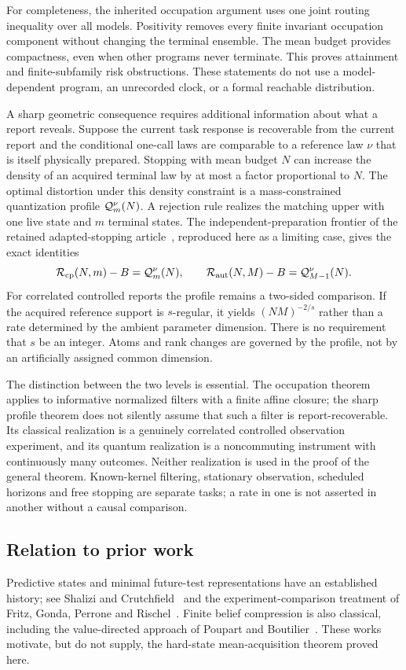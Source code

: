 For completeness, the inherited occupation argument uses one joint routing inequality over all models. Positivity removes every finite invariant occupation component without changing the terminal ensemble. The mean budget provides compactness, even when other programs never terminate. This proves attainment and finite-subfamily risk obstructions. These statements do not use a model-dependent program, an unrecorded clock, or a formal reachable distribution.

A sharp geometric consequence requires additional information about what a report reveals. Suppose the current task response is recoverable from the current report and the conditional one-call laws are comparable to a reference law $\nu$ that is itself physically prepared. Stopping with mean budget $N$ can increase the density of an acquired terminal law by at most a factor proportional to $N$. The optimal distortion under this density constraint is a mass-constrained quantization profile $\mathcal Q_m^\nu(N)$. A rejection rule realizes the matching upper with one live state and $m$ terminal states. The independent-preparation frontier of the retained adapted-stopping article~\cite{GTFStopped}, reproduced here as a limiting case, gives the exact identities
\begin{equation}\label{eq:intro-exact}
 \mathcal R_{\mathrm{cp}}(N,m)-B=\mathcal Q_m^\nu(N),\qquad
 \mathcal R_{\mathrm{aut}}(N,M)-B=\mathcal Q_{M-1}^\nu(N).
\end{equation}
For correlated controlled reports the profile remains a two-sided comparison. If the acquired reference support is $s$-regular, it yields $(NM)^{-2/s}$ rather than a rate determined by the ambient parameter dimension. There is no requirement that $s$ be an integer. Atoms and rank changes are governed by the profile, not by an artificially assigned common dimension.

The distinction between the two levels is essential. The occupation theorem applies to informative normalized filters with a finite affine closure; the sharp profile theorem does not silently assume that such a filter is report-recoverable. Its classical realization is a genuinely correlated controlled observation experiment, and its quantum realization is a noncommuting instrument with continuously many outcomes. Neither realization is used in the proof of the general theorem. Known-kernel filtering, stationary observation, scheduled horizons and free stopping are separate tasks; a rate in one is not asserted in another without a causal comparison.

\subsection*{Relation to prior work}
Predictive states and minimal future-test representations have an established history; see Shalizi and Crutchfield~\cite{SC} and the experiment-comparison treatment of Fritz, Gonda, Perrone and Rischel~\cite{FGPR}. Finite belief compression is also classical, including the value-directed approach of Poupart and Boutilier~\cite{PB}. These works motivate, but do not supply, the hard-state mean-acquisition theorem proved here.

